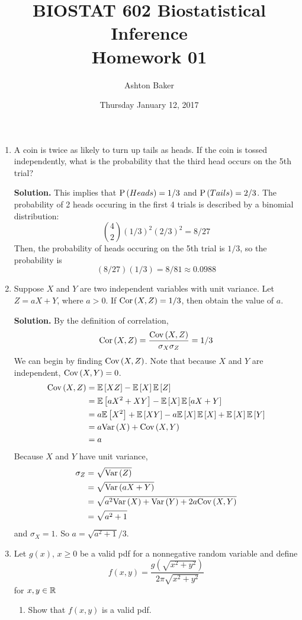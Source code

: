 \documentclass[titlepage]{article}
\begin{document}
\title{BIOSTAT 602 Biostatistical Inference\\Homework 01}
\author{Ashton Baker}
\date{Thursday January 12, 2017}
\maketitle
\begin{enumerate}
\item A coin is twice as likely to turn up tails as heads. If the coin is tossed independently, what is the probability that the third head occurs on the 5th trial?

\textbf{Solution.} This implies that $\P{Heads} = 1/3$ and $\P{Tails} = 2/3$. The probability of 2 heads occuring in the first 4 trials is described by a binomial distribution:
\[\binom{4}{2}(1/3)^2(2/3)^2 = 8/27\]
Then, the probability of heads occuring on the 5th trial is $1/3$, so the probability is
\[(8/27)(1/3) = 8/81 \approx 0.0988\]

\item Suppose $X$ and $Y$ are two independent variables with unit variance. Let $Z = aX + Y$, where $a > 0$. If $\cor{X, Z} = 1/3$, then obtain the value of $a$.

\textbf{Solution.} By the definition of correlation,
\[\cor{X, Z} = \frac{\cov{X, Z}}{\sigma_X \sigma_Z} = 1/3\]
We can begin by finding $\cov{X, Z}$. Note that because $X$ and $Y$ are independent, $\cov{X, Y} = 0$.
\[\begin{aligned}
\cov{X, Z} &= \ev{XZ} - \ev{X}\ev{Z} \\
           &= \ev{aX^2 + XY} - \ev{X}\ev{aX + Y} \\
           &= a\ev{X^2} + \ev{XY} - a\ev{X}\ev{X} + \ev{X}\ev{Y} \\
           &= a \var{X} + \cov{X, Y} \\
           &= a
\end{aligned}\]
Because $X$ and $Y$ have unit variance,
\[\begin{aligned}
\sigma_Z &= \sqrt{\var{Z}} \\
         &= \sqrt{\var{aX + Y}} \\
         &= \sqrt{a^2 \var{X} + \var{Y} + 2a\cov{X, Y}} \\
         &= \sqrt{a^2 + 1}
\end{aligned}\]
and $\sigma_X = 1$. So $a = \sqrt{a^2 + 1} / 3$.

\item Let $g(x)$, $x \geq 0$ be a valid pdf for a nonnegative random variable and define
\[ f(x, y) = \frac{ g(\sqrt{x^2 + y^2}) }{ 2\pi \sqrt{x^2 + y^2} }\]
for $x, y \in \R$
  \begin{enumerate}
  \item Show that $f(x, y)$ is a valid pdf.


\end{enumerate}
\end{enumerate}
\end{document}
